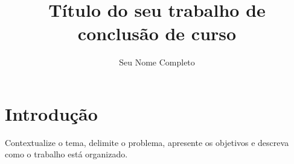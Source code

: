 \documentclass[12pt,a4paper,oneside]{book}
\title{Título do seu trabalho de conclusão de curso}
\author{Seu Nome Completo}
\begin{document}
\frontmatter

\maketitle

\folhaaprovacao

\makeabstracts


\tableofcontents

\mainmatter


\chapter{Introdução}\label{cap:introducao}

Contextualize o tema, delimite o problema, apresente os objetivos e
descreva como o trabalho está organizado.
\end{document}
